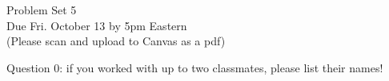 \documentclass[12pt]{article}
\begin{document}

%
\newcommand{\detritus}[1]{}


\thispagestyle{empty}



\iffalse
\parindent = 0pt
\hspace*{0.0in}\parbox[t]{2.5in}{
Philosophy 24.241\\[3pt]
Symbolic Logic\\[3pt]
Fall, 2022
}
\fi 


\iffalse 
\begin{center}
\Large\bf Problem Set 5 \large{(24.241 Symbolic Logic)}\\[1ex] 
 Due Fri. {\bf{October 14th}} by 5pm Eastern\\[3ex]
\end{center}
\fi

\begin{center}
\Large Problem Set 5\\[1ex] 
 Due Fri. October 13 by 5pm Eastern\\ 
  \vspace{.1in}
  \normalsize{(Please scan and upload to Canvas as a pdf)} \\[3ex] 
\end{center}


Question 0: if you worked with up to two classmates, please list their names! 

\end{document}
